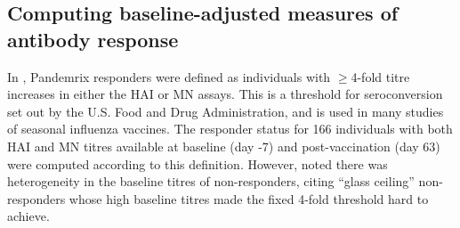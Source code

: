 \subsection{Computing baseline-adjusted measures of antibody response}
\label{subsec:hird_dge_TRI}

In \autocite{sobolev2016AdjuvantedInfluenzaH1N1Vaccination}, Pandemrix responders were defined as individuals with $\ge$4-fold titre increases in either the \gls{HAI} or \gls{MN} assays.
This is a threshold for seroconversion set out by the U.S. Food and Drug Administration\autocite{foodanddrugadministration2007GuidanceIndustryClinical}, and is used in many studies of seasonal influenza vaccines\autocite{hagan2015SystemsVaccinologyEnabling}.
The responder status for 166 individuals with both \gls{HAI} and \gls{MN} titres available at baseline (day -7) and post-vaccination (day 63) were computed according to this definition.
However, \autocite{sobolev2016AdjuvantedInfluenzaH1N1Vaccination} noted there was heterogeneity in the baseline titres of non-responders, citing \enquote{glass ceiling} non-responders whose high baseline titres made the fixed 4-fold threshold hard to achieve.
